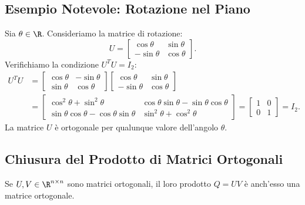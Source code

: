 \subsection{Esempio Notevole: Rotazione nel Piano}

\begin{example}
Sia $\theta \in \R$. Consideriamo la matrice di rotazione:
\begin{equation}
    U = \begin{bmatrix} \cos\theta & \sin\theta \\ -\sin\theta & \cos\theta \end{bmatrix}.
\end{equation}
Verifichiamo la condizione $U^T U = I_2$:
\begin{align}
    U^T U &= \begin{bmatrix} \cos\theta & -\sin\theta \\ \sin\theta & \cos\theta \end{bmatrix} \begin{bmatrix} \cos\theta & \sin\theta \\ -\sin\theta & \cos\theta \end{bmatrix} \nonumber \\
    &= \begin{bmatrix}
        \cos^2\theta + \sin^2\theta & \cos\theta\sin\theta - \sin\theta\cos\theta \\
        \sin\theta\cos\theta - \cos\theta\sin\theta & \sin^2\theta + \cos^2\theta
    \end{bmatrix} = \begin{bmatrix} 1 & 0 \\ 0 & 1 \end{bmatrix} = I_2.
\end{align}
La matrice $U$ \`e ortogonale per qualunque valore dell'angolo $\theta$.
\end{example}

\subsection{Chiusura del Prodotto di Matrici Ortogonali}

\begin{proposition}
Se $U, V \in \R^{n \times n}$ sono matrici ortogonali, il loro prodotto $Q = UV$ \`e anch'esso una matrice ortogonale.
\end{proposition}

